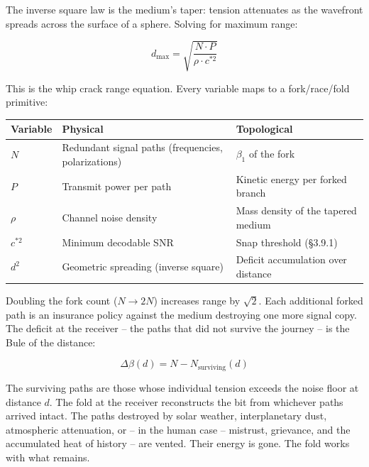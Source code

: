 \documentclass[
  11pt,
]{article}
\newcounter{none} %
\begin{document}
The inverse square law is the medium's taper: tension attenuates as the
wavefront spreads across the surface of a sphere. Solving for maximum
range:

\[d_{\max} = \sqrt{\frac{N \cdot P}{\rho \cdot c^{*2}}}\]

This is the whip crack range equation. Every variable maps to a
fork/race/fold primitive:

{\def\LTcaptype{none} %
\begin{longtable}[]{@{}
  >{\raggedright\arraybackslash}p{}
  >{\raggedright\arraybackslash}p{}
  >{\raggedright\arraybackslash}p{}@{}}
\toprule\noalign{}
\begin{minipage}[b]{\linewidth}\raggedright
Variable
\end{minipage} & \begin{minipage}[b]{\linewidth}\raggedright
Physical
\end{minipage} & \begin{minipage}[b]{\linewidth}\raggedright
Topological
\end{minipage} \\
\midrule\noalign{}
\endhead
\bottomrule\noalign{}
\endlastfoot
\(N\) & Redundant signal paths (frequencies, polarizations) &
\(\beta_1\) of the fork \\
\(P\) & Transmit power per path & Kinetic energy per forked branch \\
\(\rho\) & Channel noise density & Mass density of the tapered medium \\
\(c^{*2}\) & Minimum decodable SNR & Snap threshold (§3.9.1) \\
\(d^2\) & Geometric spreading (inverse square) & Deficit accumulation
over distance \\
\end{longtable}
}

Doubling the fork count (\(N \to 2N\)) increases range by \(\sqrt{2}\).
Each additional forked path is an insurance policy against the medium
destroying one more signal copy. The deficit at the receiver -- the
paths that did not survive the journey -- is the Bule of the distance:

\[\Delta\beta(d) = N - N_{\text{surviving}}(d)\]

The surviving paths are those whose individual tension exceeds the noise
floor at distance \(d\). The fold at the receiver reconstructs the bit
from whichever paths arrived intact. The paths destroyed by solar
weather, interplanetary dust, atmospheric attenuation, or -- in the
human case -- mistrust, grievance, and the accumulated heat of history
-- are vented. Their energy is gone. The fold works with what remains.
\end{document}
